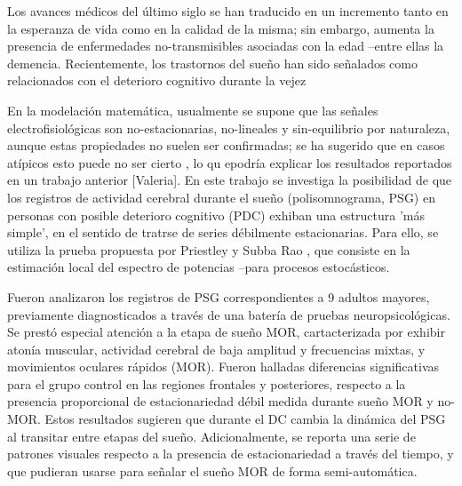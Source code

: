 \documentclass[12pt,a4paper]{mitthesis}
\begin{document}
{\small

Los avances m\'edicos del \'ultimo siglo se han traducido en un incremento tanto en la esperanza
de vida como en la calidad de la misma; sin embargo, aumenta la presencia de enfermedades 
no-transmisibles asociadas con la edad --entre ellas la demencia.
Recientemente, los trastornos del sue\~no han sido se\~nalados como relacionados con el deterioro 
cognitivo durante la vejez \cite{Amer13,Miyata13,Potvin12}

En la modelaci\'on matem\'atica, usualmente se supone que las se\~nales electrofisiol\'ogicas son 
no-estacionarias, no-lineales y sin-equilibrio por naturaleza, aunque estas propiedades no suelen 
ser confirmadas; se ha sugerido que en casos at\'ipicos esto puede no ser cierto
\cite{McEwen75,Cohen77,Sugimoto78},
lo qu epodr\'ia explicar los resultados reportados en un trabajo anterior [Valeria]. 
En este trabajo se investiga la posibilidad de que los registros de actividad cerebral durante el 
sue\~no (polisomnograma, PSG) en personas con posible deterioro cognitivo (PDC) exhiban una 
estructura 'm\'as simple', en el sentido de tratrse de series d\'ebilmente estacionarias.
Para ello, se utiliza la prueba propuesta por Priestley y Subba Rao \cite{Priestley69}, que consiste
en la estimaci\'on local del espectro de potencias --para procesos estoc\'asticos.

Fueron analizaron los registros de PSG correspondientes a 9 adultos mayores, previamente 
diagnosticados a trav\'es de una bater\'ia de pruebas neuropsicol\'ogicas.
Se prest\'o especial atenci\'on a la etapa de sue\~no MOR, cartacterizada por exhibir aton\'ia
muscular, actividad cerebral de baja amplitud y frecuencias mixtas, y movimientos oculares r\'apidos
(MOR).
Fueron halladas diferencias significativas para el grupo control en las regiones
frontales y posteriores, respecto a
la presencia proporcional de 
estacionariedad d\'ebil 
medida durante sue\~no MOR y no-MOR.
Estos resultados sugieren que durante el DC cambia la din\'amica del PSG al transitar entre 
etapas del sue\~no. 
Adicionalmente, se reporta una serie de patrones visuales respecto a la presencia de 
estacionariedad a trav\'es del tiempo, y que pudieran usarse para se\~nalar el sue\~no
MOR de forma semi-autom\'atica.%

}

\end{document}

